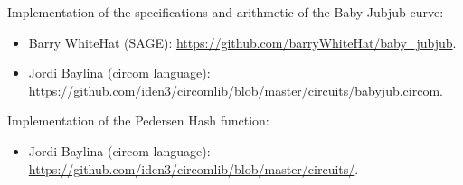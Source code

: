	Implementation of the specifications and arithmetic of the Baby-Jubjub curve: 
		\begin{itemize}
			\item Barry WhiteHat (SAGE):
			\url{https://github.com/barryWhiteHat/baby_jubjub}.
			\item Jordi Baylina (circom language):
			\url{https://github.com/iden3/circomlib/blob/master/circuits/babyjub.circom}.
		\end{itemize}
	Implementation of the Pedersen Hash function: 
		\begin{itemize}
			\item Jordi Baylina (circom language):
			\url{https://github.com/iden3/circomlib/blob/master/circuits/}.
		\end{itemize}


